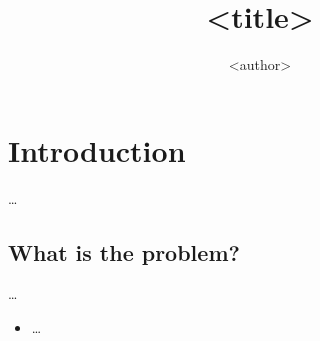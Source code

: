 \title{%
  <title>
}
\author{<author>}

\begin{frame}
  \maketitle
\end{frame}

\mode*

\begin{abstract}
  
\end{abstract}


\section{Introduction}

\dots

\subsection{What is the problem?}

\dots

\begin{frame}
  \begin{itemize}
    \item \dots
  \end{itemize}
\end{frame}



\begin{frame}[allowframebreaks]
  \printbibliography{}
\end{frame}
